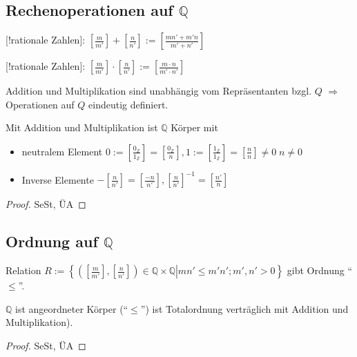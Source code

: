 \subsection{Rechenoperationen auf $\mathbb{Q}$}
\begin{*definition}
	[!rationale Zahlen]: $\left[ \frac{m}{m'}\right] + \left[ \frac{n}{n'}\right] := \left[ \frac{mn' + m'n}{m'+n'}\right]$
	
	[!rationale Zahlen]: $\left[\frac{m}{m'}\right]\cdot\left[\frac{n}{n'}\right]:=\left[\frac{m\cdot n}{m'\cdot n'}\right]$
	
	Addition und Multiplikation sind unabhängig vom Repräsentanten bzgl. $Q$ $\Rightarrow$ Operationen auf $Q$ eindeutig definiert.
\end{*definition}

\begin{proposition}
	Mit Addition und Multiplikation ist $\mathbb{Q}$ Körper mit
	\begin{itemize}
	\item neutralem Element $0:=\left[\frac{0_\mathbb{Z}}{1_\mathbb{Z}}\right] = \left[\frac{0_\mathbb{Z}}{n}\right], 1 :=\left[\frac{1_\mathbb{Z}}{1_\mathbb{Z}}\right] = \left[ \frac{n}{n}\right] \neq 0\;n\neq 0$
	\item Inverse Elemente $-\left[\frac{n}{n'}\right] = \left[ \frac{-n}{n'}\right], \left[\frac{n}{n'}\right]^{-1} = \left[\frac{n'}{n}\right]$
	\end{itemize}
\end{proposition}
\begin{proof}
	SeSt, ÜA
\end{proof}

\subsection{Ordnung auf $\mathbb{Q}$}
\begin{*definition}
	Relation $R:=\left\lbrace \left. \left( \left[\frac{m}{m'}\right],\left[\frac{n}{n'}\right]\right)\in\mathbb{Q}\times\mathbb{Q} \right| mn'\le m'n'; m',n'>0\right\rbrace$ gibt Ordnung "`$\le$"'.
\end{*definition}

\begin{proposition}
	$\mathbb{Q}$ ist angeordneter Körper ("`$\leq$"') ist Totalordnung verträglich mit Addition und Multiplikation).
\end{proposition}
\begin{proof}
	SeSt, ÜA
\end{proof}

